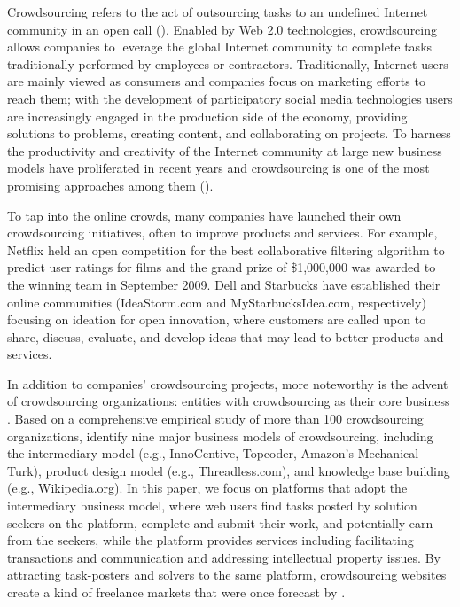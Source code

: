 \documentclass[12pt]{article}
\begin{document}
Crowdsourcing refers to the act of outsourcing tasks to an undefined
Internet community in an open call (\citet{Howe:2006}). Enabled by
Web 2.0 technologies, crowdsourcing allows companies to leverage the
global Internet community to complete tasks traditionally performed
by employees or contractors. Traditionally, Internet users are mainly
viewed as consumers and companies focus on marketing efforts to reach
them; with the development of participatory social media technologies
users are increasingly engaged in the production side of the economy,
providing solutions to problems, creating content, and collaborating
on projects. To harness the productivity and creativity of the Internet
community at large new business models have proliferated in recent
years and crowdsourcing is one of the most promising approaches among
them (\citet{Brabham:2013}).

To tap into the online crowds, many companies have launched their
own crowdsourcing initiatives, often to improve products and services.
For example, Netflix held an open competition for the best collaborative
filtering algorithm to predict user ratings for films and the grand
prize of \$1,000,000 was awarded to the winning team in September
2009. Dell and Starbucks have established their online communities
(IdeaStorm.com and MyStarbucksIdea.com, respectively) focusing on
ideation for open innovation, where customers are called upon to share,
discuss, evaluate, and develop ideas that may lead to better products
and services.

In addition to companies' crowdsourcing projects, more noteworthy
is the advent of crowdsourcing organizations: entities with crowdsourcing
as their core business \citep{Hempel:2006, Howe:2006, Saxton:2013}.
Based on a comprehensive empirical study of more than 100 crowdsourcing
organizations, \citet{Saxton:2013} identify nine major business models
of crowdsourcing, including the intermediary model (e.g., InnoCentive,
Topcoder, Amazon's Mechanical Turk), product design model (e.g., Threadless.com),
and knowledge base building (e.g., Wikipedia.org). In this paper,
we focus on platforms that adopt the intermediary
business model, where web users find tasks posted by solution seekers
on the platform, complete and submit their work, and potentially earn
from the seekers, while the platform provides services including facilitating
transactions and communication and addressing intellectual property
issues. By attracting task-posters and solvers to the same platform,
crowdsourcing websites create a kind of freelance markets that were
once forecast by \citet{Malone:2004}.
\end{document}
